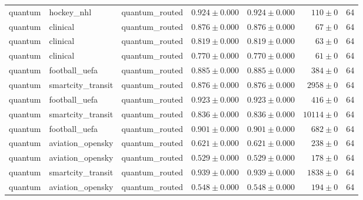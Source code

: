 \begin{table}[htbp]
\begin{tabular}{l l l r r r r}
quantum & hockey\_nhl & quantum\_routed & $0.924\pm0.000$ & $0.924\pm0.000$ & $110\pm0$ & 64 \\
quantum & clinical & quantum\_routed & $0.876\pm0.000$ & $0.876\pm0.000$ & $67\pm0$ & 64 \\
quantum & clinical & quantum\_routed & $0.819\pm0.000$ & $0.819\pm0.000$ & $63\pm0$ & 64 \\
quantum & clinical & quantum\_routed & $0.770\pm0.000$ & $0.770\pm0.000$ & $61\pm0$ & 64 \\
quantum & football\_uefa & quantum\_routed & $0.885\pm0.000$ & $0.885\pm0.000$ & $384\pm0$ & 64 \\
quantum & smartcity\_transit & quantum\_routed & $0.876\pm0.000$ & $0.876\pm0.000$ & $2958\pm0$ & 64 \\
quantum & football\_uefa & quantum\_routed & $0.923\pm0.000$ & $0.923\pm0.000$ & $416\pm0$ & 64 \\
quantum & smartcity\_transit & quantum\_routed & $0.836\pm0.000$ & $0.836\pm0.000$ & $10114\pm0$ & 64 \\
quantum & football\_uefa & quantum\_routed & $0.901\pm0.000$ & $0.901\pm0.000$ & $682\pm0$ & 64 \\
quantum & aviation\_opensky & quantum\_routed & $0.621\pm0.000$ & $0.621\pm0.000$ & $238\pm0$ & 64 \\
quantum & aviation\_opensky & quantum\_routed & $0.529\pm0.000$ & $0.529\pm0.000$ & $178\pm0$ & 64 \\
quantum & smartcity\_transit & quantum\_routed & $0.939\pm0.000$ & $0.939\pm0.000$ & $1838\pm0$ & 64 \\
quantum & aviation\_opensky & quantum\_routed & $0.548\pm0.000$ & $0.548\pm0.000$ & $194\pm0$ & 64 \\
\hline
\end{tabular}
\end{table}
